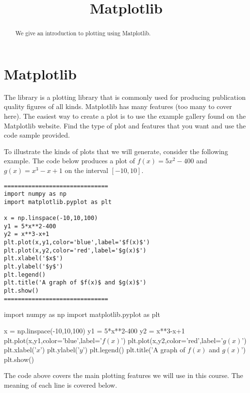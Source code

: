 \documentclass{ximera}
\title{Matplotlib}
\begin{document}
  
\begin{abstract}  
We give an introduction to plotting using Matplotlib.
\end{abstract}  
\maketitle

\section{Matplotlib}

The  library is a plotting library that is commonly used for producing publication quality figures of all kinds. Matplotlib has many features (too many to cover here). The easiest way to create a plot is to use the example gallery found on the Matplotlib website. Find the type of plot and features that you want and use the code sample provided.

To illustrate the kinds of plots that we will generate, consider the following example. The code below produces a plot of $f(x)=5x^2-400$ and $g(x)=x^3-x+1$ on the interval $[-10,10]$. 

\begin{verbatim}
==============================
import numpy as np
import matplotlib.pyplot as plt

x = np.linspace(-10,10,100)
y1 = 5*x**2-400
y2 = x**3-x+1
plt.plot(x,y1,color='blue',label='$f(x)$')
plt.plot(x,y2,color='red',label='$g(x)$')
plt.xlabel('$x$')
plt.ylabel('$y$')
plt.legend()
plt.title('A graph of $f(x)$ and $g(x)$')
plt.show()
==============================
\end{verbatim}

\begin{sageOutput}
import numpy as np
import matplotlib.pyplot as plt

x = np.linspace(-10,10,100)
y1 = 5*x**2-400
y2 = x**3-x+1
plt.plot(x,y1,color='blue',label='$f(x)$')
plt.plot(x,y2,color='red',label='$g(x)$')
plt.xlabel('$x$')
plt.ylabel('$y$')
plt.legend()
plt.title('A graph of $f(x)$ and $g(x)$')
plt.show()
\end{sageOutput}

The code above covers the main plotting features we will use in this course. The meaning of each line is covered below.
\end{document}

